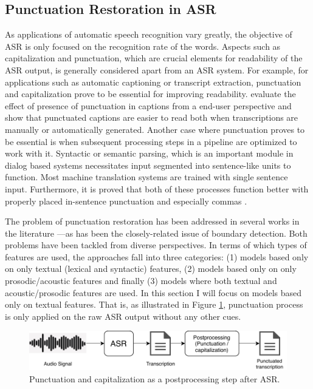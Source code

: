 \subsection{Punctuation Restoration in ASR}
\label{sota:punk_on_asr}

As applications of automatic speech recognition vary greatly, the objective of ASR is only focused on the recognition rate of the words. Aspects such as capitalization and punctuation, which are crucial elements for readability of the ASR output, is generally considered apart from an ASR system. For example, for applications such as automatic captioning or transcript extraction, punctuation and capitalization prove to be essential for improving readability. \cite{Tundik2018} evaluate the effect of presence of punctuation in captions from a end-user perspective and show that punctuated captions are easier to read both when transcriptions are manually or automatically generated. Another case where punctuation proves to be essential is when subsequent processing steps in a pipeline are optimized to work with it. Syntactic or semantic parsing, which is an important module in dialog based systems necessitates input segmented into sentence-like units to function. Most machine translation systems are trained with single sentence input. Furthermore, it is proved that both of these processes function better with properly placed in-sentence punctuation and especially commas \citep{10045_76089, Jones:1994:ERP:991886.991960}. 

The problem of punctuation restoration has been addressed in several works in the literature ---as has been the closely-related issue of boundary detection. Both problems have been tackled from diverse perspectives. In terms of which types of features are used, the approaches fall into three categories: (1) models based only on only textual (lexical and syntactic) features, (2) models based only on only prosodic/acoustic features and finally (3) models where both textual and acoustic/prosodic features are used. In this section I will focus on models based only on textual features. That is, as illustrated in Figure \ref{sota:figure:punc_on_text}, punctuation process is only applied on the raw ASR output without any other cues. 

\begin{figure}[t]
  \centering
  \includegraphics[width=\linewidth]{img/Punctuation_on_ASR_output.pdf}
  \caption{Punctuation and capitalization as a postprocessing step after ASR.}
  \label{sota:figure:punc_on_text}
\end{figure}

